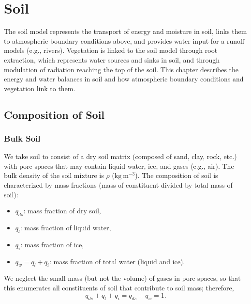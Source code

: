 \documentclass{report}
\begin{document}
\chapter{Soil}\label{c:soil}

The soil model represents the transport of energy and moisture in soil, links them to atmospheric boundary conditions above, and provides water input for a runoff models (e.g., rivers). Vegetation is linked to the soil model through root extraction, which represents water sources and sinks in soil, and through modulation of radiation reaching the top of the soil.  This chapter describes the energy and water balances in soil and how atmospheric boundary conditions and vegetation link to them.

\section{Composition of Soil}

\subsection{Bulk Soil}

We take soil to consist of a dry soil matrix (composed of sand, clay, rock, etc.) with pore spaces that may contain liquid water, ice, and gases (e.g., air). The bulk density of the soil mixture is $\rho$ ($\mathrm{kg~m^{-3}}$). The composition of soil is characterized by mass fractions (mass of constituent divided by total mass of soil):
\begin{itemize}
    \item $q_{ds}$: mass fraction of dry soil,
    \item $q_l$: mass fraction of liquid water,
    \item $q_i$: mass fraction of ice,
    \item $q_w = q_l + q_i$: mass fraction of total water (liquid and ice).
\end{itemize}
We neglect the small mass (but not the volume) of gases in pore spaces, so that this enumerates all constituents of soil that contribute to soil mass; therefore, 
\[
q_{ds} + q_l + q_i = q_{ds} + q_w = 1.
\]
\end{document}
